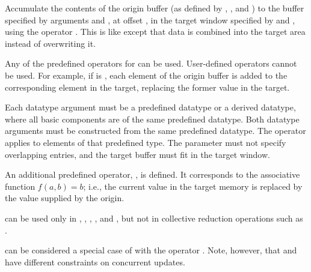 
Accumulate the contents of the origin buffer
(as defined by ,
, and 
)
to the buffer specified by arguments  and
,
at offset , in
the target window specified by  and ,
using the operator
.
This is like  except that data is combined into
the target area instead of overwriting it.

Any of the predefined operators for  can be
used.  User-defined operators cannot be used.
For example, if  is ,
each element of the origin buffer is added to the corresponding element
in the target, replacing the former value in the target.

Each datatype argument must be a predefined datatype or a derived
datatype, where all basic components are of the same predefined
datatype.  Both datatype arguments must be constructed from the same
predefined datatype.
The operator  applies to elements of that predefined
type. The parameter  must not specify overlapping 
entries, and the target buffer must fit in the target window.

An additional predefined operator, , is defined.
It corresponds to the associative function $f(a,b) = b$; i.e., the current
value in the target memory is replaced by the value supplied by the
origin.


 can be used only in ,
,
  , , and
  , but not in collective
reduction operations such as .

\begin{users}
 can be considered a special case of 
with the  operator .
Note, however, that  and 
have different constraints on concurrent updates.
\end{users}

